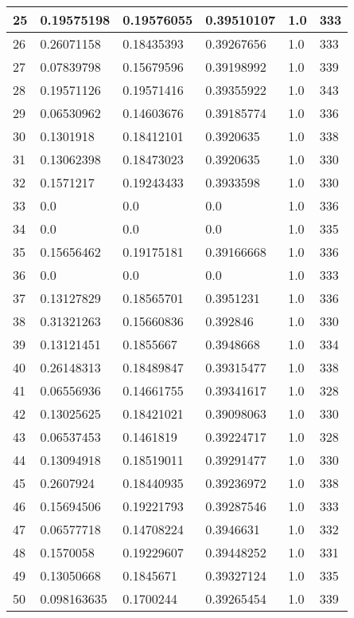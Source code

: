 \begin{longtable}{|l|l|l|l|l|l|}
25 & 0.19575198 & 0.19576055 & 0.39510107 & 1.0 & 333 \\ \hline 
26 & 0.26071158 & 0.18435393 & 0.39267656 & 1.0 & 333 \\ \hline 
27 & 0.07839798 & 0.15679596 & 0.39198992 & 1.0 & 339 \\ \hline 
28 & 0.19571126 & 0.19571416 & 0.39355922 & 1.0 & 343 \\ \hline 
29 & 0.06530962 & 0.14603676 & 0.39185774 & 1.0 & 336 \\ \hline 
30 & 0.1301918 & 0.18412101 & 0.3920635 & 1.0 & 338 \\ \hline 
31 & 0.13062398 & 0.18473023 & 0.3920635 & 1.0 & 330 \\ \hline 
32 & 0.1571217 & 0.19243433 & 0.3933598 & 1.0 & 330 \\ \hline 
33 & 0.0 & 0.0 & 0.0 & 1.0 & 336 \\ \hline 
34 & 0.0 & 0.0 & 0.0 & 1.0 & 335 \\ \hline 
35 & 0.15656462 & 0.19175181 & 0.39166668 & 1.0 & 336 \\ \hline 
36 & 0.0 & 0.0 & 0.0 & 1.0 & 333 \\ \hline 
37 & 0.13127829 & 0.18565701 & 0.3951231 & 1.0 & 336 \\ \hline 
38 & 0.31321263 & 0.15660836 & 0.392846 & 1.0 & 330 \\ \hline 
39 & 0.13121451 & 0.1855667 & 0.3948668 & 1.0 & 334 \\ \hline 
40 & 0.26148313 & 0.18489847 & 0.39315477 & 1.0 & 338 \\ \hline 
41 & 0.06556936 & 0.14661755 & 0.39341617 & 1.0 & 328 \\ \hline 
42 & 0.13025625 & 0.18421021 & 0.39098063 & 1.0 & 330 \\ \hline 
43 & 0.06537453 & 0.1461819 & 0.39224717 & 1.0 & 328 \\ \hline 
44 & 0.13094918 & 0.18519011 & 0.39291477 & 1.0 & 330 \\ \hline 
45 & 0.2607924 & 0.18440935 & 0.39236972 & 1.0 & 338 \\ \hline 
46 & 0.15694506 & 0.19221793 & 0.39287546 & 1.0 & 333 \\ \hline 
47 & 0.06577718 & 0.14708224 & 0.3946631 & 1.0 & 332 \\ \hline 
48 & 0.1570058 & 0.19229607 & 0.39448252 & 1.0 & 331 \\ \hline 
49 & 0.13050668 & 0.1845671 & 0.39327124 & 1.0 & 335 \\ \hline 
50 & 0.098163635 & 0.1700244 & 0.39265454 & 1.0 & 339 \\ \hline 
\end{longtable}